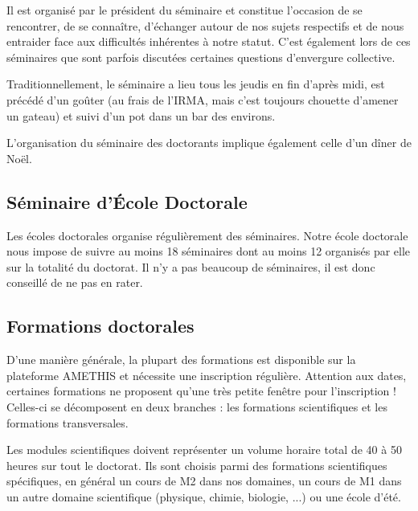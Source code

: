 \documentclass[a5paper]{article}
\begin{document}
\vspace{1em}

Il est organisé par le président du séminaire et constitue l'occasion de se rencontrer, de se connaître, d'échanger autour de nos sujets respectifs et de nous entraider face aux difficultés inhérentes à notre statut. C'est également lors de ces séminaires que sont parfois discutées certaines questions d'envergure collective.

Traditionnellement, le séminaire a lieu tous les jeudis en fin d'après midi, est précédé d'un goûter (au frais de l'IRMA, mais c'est toujours chouette d'amener un gateau) et suivi d'un pot dans un bar des environs.

\vspace{1em}

L'organisation du séminaire des doctorants implique également celle d'un dîner de Noël.

\subsection{Séminaire d'École Doctorale}
\label{subsec:semin-decole-doct}

Les écoles doctorales organise régulièrement des séminaires. Notre école doctorale nous impose de suivre au moins 18 séminaires dont au moins 12 organisés par elle sur la totalité du doctorat. Il n'y a pas beaucoup de séminaires, il est donc conseillé de ne pas en rater.

\subsection{Formations doctorales}
\label{subsec:form-doct}

D'une manière générale, la plupart des formations est disponible sur la plateforme AMETHIS et nécessite une inscription régulière. Attention aux dates, certaines formations ne proposent qu'une très petite fenêtre pour l'inscription ! Celles-ci se décomposent en deux branches : les formations scientifiques et les formations transversales.


\vspace{1em}

Les modules scientifiques doivent représenter un volume horaire total de 40 à 50 heures sur tout le doctorat. Ils sont choisis parmi des formations scientifiques spécifiques, en général un cours de M2 dans nos domaines, un cours de M1 dans un autre domaine scientifique (physique, chimie, biologie, ...) ou une école d'été.
\end{document}
